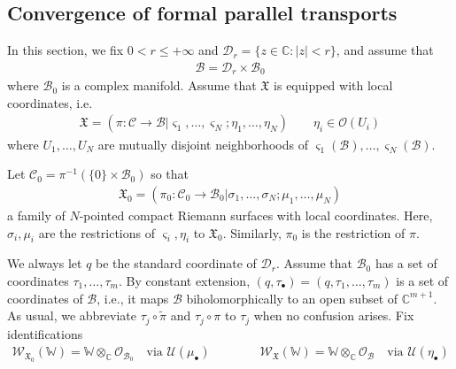 \documentclass[11pt,b5paper,notitlepage]{article}
\theoremstyle{definition}
\theoremstyle{plain}
\newcommand{\mc}{\mathcal}
\newcommand{\wtd}{\widetilde}
\newcommand{\scr}{\mathscr}
\newcommand{\sgm}{\varsigma}
\newcommand{\blt}{\bullet}
\newcommand{\Wbb}{\mathbb W}
\newcommand{\Cbb}{\mathbb C}
\newcommand{\<}{\left\langle}
\renewcommand{\>}{\right\rangle}
\newcommand{\MC}{\mathcal{C}}
\newcommand{\MB}{\mathcal{B}}
\newcommand{\fx}{\mathfrak{X}}
\numberwithin{equation}{subsection}
\begin{document}
\subsection{Convergence of formal parallel transports}\label{lbb30}






In this section, we fix $0<r\leq+\infty$ and $\mc D_r=\{z\in\Cbb:|z|<r\}$, and assume that
\begin{align*}
\MB=\mc D_r\times\MB_0
\end{align*}
where $\MB_0$ is a complex manifold. Assume that $\fx$ is equipped with local coordinates, i.e.
\begin{align*}
\fx=(\pi:\MC\rightarrow\MB|\sgm_1,\dots,\sgm_N;\eta_1,\dots,\eta_N )\qquad \eta_i\in\mc O(U_i)
\end{align*}
where $U_1,\dots,U_N$ are mutually disjoint neighborhoods of $\sgm_1(\MB),\dots,\sgm_N(\MB)$.

Let $\MC_0=\pi^{-1}(\{0\}\times\mc B_0)$ so that
\begin{align}\label{eqb65}
\fx_0=(\pi_0:\MC_0\rightarrow\MB_0|\sigma_1,\dots,\sigma_N;\mu_1,\dots,\mu_N )
\end{align}
a family of $N$-pointed compact Riemann surfaces with local coordinates. Here, $\sigma_i,\mu_i$ are the restrictions of $\sgm_i,\eta_i$ to $\fx_0$. Similarly, $\pi_0$ is the restriction of $\pi$.


We always let $q$ be the standard coordinate of $\mc D_r$. Assume that $\MB_0$ has a set of coordinates $\tau_1,\dots,\tau_m$. By constant extension, $(q,\tau_\blt)=(q,\tau_1,\dots,\tau_m)$ is a set of coordinates of $\MB$, i.e., it maps $\MB$ biholomorphically to an open subset of $\Cbb^{m+1}$. As usual, we abbreviate $\tau_j\circ\wtd\pi$ and $\tau_j\circ\pi$ to $\tau_j$ when no confusion arises. Fix identifications
\begin{align*}
\scr W_{\fx_0}(\Wbb)=\Wbb\otimes_\Cbb\mc O_{\MB_0}\quad\text{via }\mc U(\mu_\blt)\qquad\qquad  \scr W_\fx(\Wbb)=\Wbb\otimes_\Cbb\mc O_\MB\quad\text{via }\mc U(\eta_\blt)
\end{align*}
\end{document}
